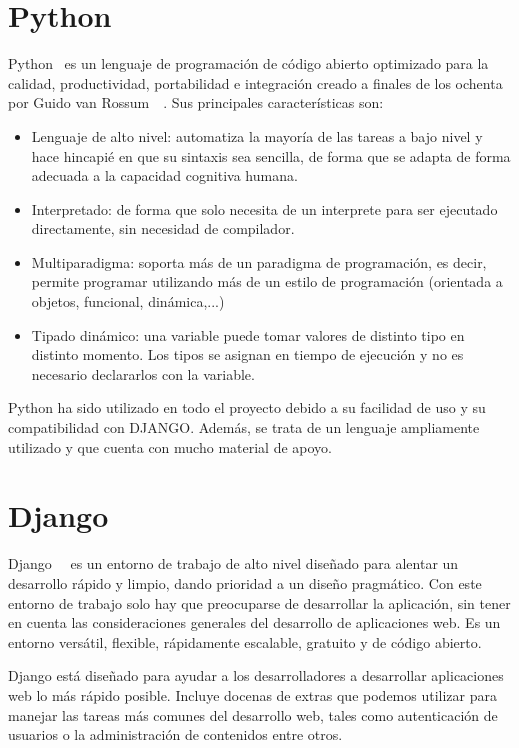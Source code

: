 \documentclass[a4paper, 12pt]{book}
\begin{document}
\section{Python} 
\label{sec:seccion2}
Python~\cite{python:_python} es un lenguaje de programación de código abierto optimizado para la calidad, productividad, portabilidad e integración creado a finales de los ochenta por Guido van Rossum~\cite{lutz:_programming_python}~\cite{beazley:_essential_reference}. Sus principales características son:

\begin{itemize}
  \item Lenguaje de alto nivel: automatiza la mayoría de las tareas a bajo nivel y hace hincapié en que su sintaxis sea sencilla, de forma que se adapta de forma adecuada a la capacidad cognitiva humana.
  \item Interpretado: de forma que solo necesita de un interprete para ser ejecutado directamente, sin necesidad de compilador.
  \item Multiparadigma: soporta más de un paradigma de programación, es decir, permite programar utilizando más de un estilo de programación (orientada a objetos, funcional, dinámica,...)
  \item Tipado dinámico: una variable puede tomar valores de distinto tipo en distinto momento. Los tipos se asignan en tiempo de ejecución y no es necesario declararlos con la variable.
\end{itemize}

Python ha sido utilizado en todo el proyecto debido a su facilidad de uso y su compatibilidad con DJANGO. Además, se trata de un lenguaje ampliamente utilizado y que cuenta con mucho material de apoyo.

\section{Django} 
\label{sec:seccion3}
Django~\cite{django:_django}~\cite{bennet:_django} es un entorno de trabajo de alto nivel diseñado para alentar un desarrollo rápido y limpio, dando prioridad a un diseño pragmático. Con este entorno de trabajo solo hay que preocuparse de desarrollar la aplicación, sin tener en cuenta las consideraciones generales del desarrollo de aplicaciones web. Es un entorno versátil, flexible, rápidamente escalable, gratuito y de código abierto.

Django está diseñado para ayudar a los desarrolladores a desarrollar aplicaciones web lo más rápido posible. Incluye docenas de extras que podemos utilizar para manejar las tareas más comunes del desarrollo web, tales como autenticación de usuarios o  la administración de contenidos entre otros.
\end{document}
